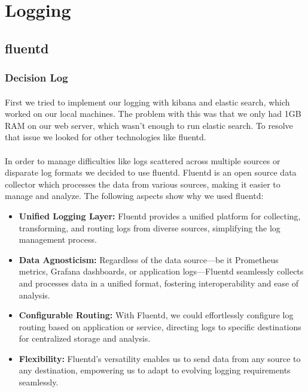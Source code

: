 \section{Logging}
\subsection{fluentd}
\subsubsection{Decision Log}
\paragraph{} First we tried to implement our logging with kibana and elastic search, which worked on our local machines. The problem with this was that we only had 1GB RAM on our web server,  which wasn't enough to run elastic search. To resolve that issue we looked for other technologies like fluentd.

\paragraph{} In order to manage difficulties like logs scattered across multiple sources or disparate log formats we decided to use fluentd. Fluentd is an open source data collector which processes the data from various sources, making it easier to manage and analyze. The following aspects show why we used fluentd: 
\begin{itemize}
    \item \textbf{Unified Logging Layer:} Fluentd provides a unified platform for collecting, transforming, and routing logs from diverse sources, simplifying the log management process.
    \item \textbf{Data Agnosticism:} Regardless of the data source—be it Prometheus metrics, Grafana dashboards, or application logs—Fluentd seamlessly collects and processes data in a unified format, fostering interoperability and ease of analysis.
    \item \textbf{Configurable Routing:} With Fluentd, we could effortlessly configure log routing based on application or service, directing logs to specific destinations for centralized storage and analysis.
    \item \textbf{Flexibility:} Fluentd's versatility enables us to send data from any source to any destination, empowering us to adapt to evolving logging requirements seamlessly.
\end{itemize}

